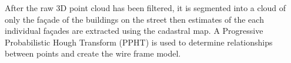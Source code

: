 	After the raw 3D point cloud has been filtered, it is segmented into a cloud of only the fa\c{c}ade of the buildings on the street then estimates of the each individual fa\c{c}ades are extracted using the cadastral map. A Progressive Probabilistic Hough Transform (PPHT) is used to determine relationships between points and create the wire frame model.
	
	
	
